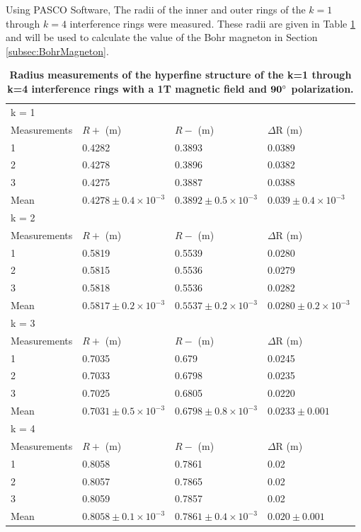 \documentclass[twocolumn]{article}
\begin{document}
			Using PASCO Software, The radii of the inner and outer rings of the $k=1$ through $k=4$ interference rings were measured.
			These radii are given in Table \ref{tab:RadiusMeasurements} and will be used to calculate the value of the Bohr magneton in Section \ref{subsec:BohrMagneton}.
			\begin{table}[]
				\centering
				\begin{tabular}{l|lll}
					k = 1 & & & \\
					Measurements & $R+$ (m) & $R-$ (m)  & $\Delta$R (m) \\ \hline
					1         & 0.4282 & 0.3893  & 0.0389 \\
					2         & 0.4278 & 0.3896  & 0.0382 \\
					3         & 0.4275 & 0.3887  & 0.0388 \\
					Mean      & $0.4278\pm0.4\times10^{-3}$       & $0.3892\pm0.5\times10^{-3}$        & $0.039\pm0.4\times10^{-3}$ \\ \hline
					k = 2 & & & \\
					Measurements & $R+$ (m) & $R-$ (m)  & $\Delta$R (m) \\ \hline
					1           & 0.5819 & 0.5539 & 0.0280 \\
					2           & 0.5815 & 0.5536 & 0.0279 \\
					3           & 0.5818 & 0.5536 & 0.0282 \\
					Mean        & $0.5817\pm0.2\times10^{-3}$ & $0.5537\pm0.2\times10^{-3}$ & $0.0280\pm0.2\times10^{-3}$ \\ \hline
					k = 3 & & & \\
					Measurements & $R+$ (m) & $R-$ (m)  & $\Delta$R (m) \\ \hline
					1    & 0.7035 & 0.679  & 0.0245 \\
					2    & 0.7033 & 0.6798 & 0.0235 \\
					3    & 0.7025 & 0.6805 & 0.0220 \\
					Mean & $0.7031\pm0.5\times10^{-3}$ & $0.6798\pm0.8\times10^{-3}$ & $0.0233\pm0.001$ \\ \hline
					k = 4 & & & \\
					Measurements & $R+$ (m) & $R-$ (m)  & $\Delta$R (m) \\ \hline
					1    & 0.8058 & 0.7861 & 0.02  \\
					2    & 0.8057 & 0.7865 & 0.02  \\
					3    & 0.8059 & 0.7857 & 0.02  \\
					Mean & $0.8058\pm0.1\times10^{-3}$ & $0.7861\pm0.4\times10^{-3}$ & $0.020\pm0.001$
				\end{tabular}
				
				
				\caption{\textbf{Radius measurements of the hyperfine structure of the k=1 through k=4 interference rings with a 1T magnetic field and $\mathbf{90\degree}$ polarization.}}
				\label{tab:RadiusMeasurements}
			\end{table}
			
\end{document}
